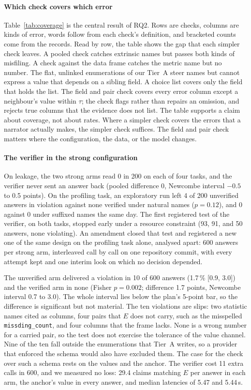 \documentclass[journal]{IEEEtran}
\begin{document}
\paragraph{Which check covers which error}
Table~\ref{tab:coverage} is the central result of RQ2. Rows are checks, columns
are kinds of error, words follow from each check's definition, and bracketed
counts come from the records. Read by row, the table shows the gap that each
simpler check leaves. A pooled check catches extrinsic names but passes both
kinds of misfiling. A check against the data frame catches the metric name but no
number. The flat, unlinked enumerations of our Tier~A steer names but cannot
express a value that depends on a sibling field. A choice list covers only the
field that holds the list. The field and pair check covers every error column
except a neighbour's value within $\tau$; the check flags rather than repairs an
omission, and rejects true columns that the evidence does not list. The table
supports a claim about coverage, not about rates. Where a simpler check covers the
errors that a narrator actually makes, the simpler check suffices. The field and
pair check matters where the configuration, the data, or the model changes.

\paragraph{The verifier in the strong configuration}
On leakage, the two strong arms read 0 in 200 on each of four tasks, and the
verifier never sent an answer back (pooled difference 0, Newcombe interval $-0.5$
to 0.5 points). On the profiling task, an exploratory run left 4 of 200
unverified answers in violation against none verified under natural names
($p=0.12$), and 0 against 0 under suffixed names the same day. The first
registered test of the verifier, on both tasks, stopped early under a resource constraint (93, 91, and 50 answers, none violating). An amendment closed that test and
registered a new one of the same design on the profiling task alone, analysed
apart: 600 answers per strong arm, interleaved call by call on one repository
commit, with every attempt kept and one interim look on which no decision
depended.

The unverified arm delivered a violation in 10 of 600 answers (1.7\,\% [0.9,
3.0]) and the verified arm in none (Fisher $p=0.002$; difference 1.7 points,
Newcombe interval 0.7 to 3.0). The whole interval lies below the plan's 5-point
bar, so the difference is significant but not material. The ten violations are
slips: two statistic names cited as columns, four pairs that $E$ does not carry,
such as the misspelled \texttt{missding\_count}, and four columns that the frame
lacks. None is a wrong number for a carried pair, so the test does not exercise
the tolerance of the value channel. Nine of the ten fall outside the enumerations
that Tier~A writes, so a provider that enforced the schema would also have
excluded them. The case for the check over such a schema rests on the values and
the anchor. The verifier cost 11 extra calls in 600, and we measured no loss: 29.4 claims matching $E$ per answer in each arm, the anchor's value
in every answer, and median latencies of 5.47 and 5.44\,s.
\end{document}

